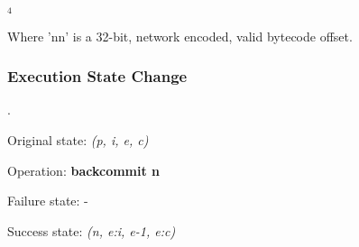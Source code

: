
$_4$\ 

Where 'nn' is a 32-bit, network encoded, valid bytecode offset.

\subsubsection{Execution State Change}

.

Original state: \textit{(p, i, e, c)}

Operation: \textbf{backcommit n}

Failure state: -

Success state: \textit{(n, e:i, e-1, e:c)}


